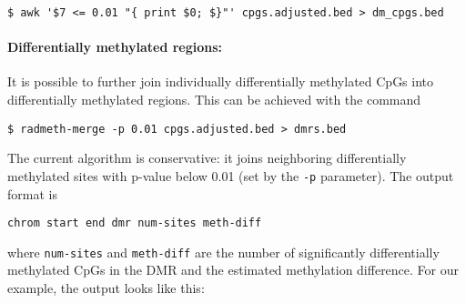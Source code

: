 \documentclass[10pt]{article}
\begin{document}
{\small{%
\begin{verbatim}
$ awk '$7 <= 0.01 "{ print $0; $}"' cpgs.adjusted.bed > dm_cpgs.bed
\end{verbatim}%
}}

\paragraph{Differentially methylated regions:} It is possible to further join
individually differentially methylated CpGs into differentially methylated
regions. This can be achieved with the command
{\small{%
\begin{verbatim}
$ radmeth-merge -p 0.01 cpgs.adjusted.bed > dmrs.bed
\end{verbatim}%
}}

The current algorithm is conservative: it joins neighboring differentially
methylated sites with p-value below 0.01 (set by the {\tt -p} parameter).
The output format is
{\small{%
\begin{verbatim}
chrom start end dmr num-sites meth-diff
\end{verbatim}%
}}
\noindent where {\tt num-sites} and {\tt meth-diff} are the number of
significantly differentially methylated CpGs in the DMR and the estimated
methylation difference. For our example, the output looks like this:
\end{document}
